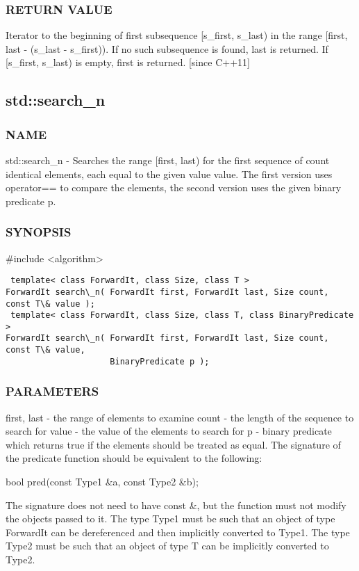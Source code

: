 \subsubsection{RETURN VALUE}
Iterator to the beginning of first subsequence [s\_first, s\_last) in the range [first, last - (s\_last - s\_first)). If no such subsequence is found, last is returned.
If [s\_first, s\_last) is empty, first is returned.  [since C++11]



\subsection{std::search\_n}

\subsubsection{NAME}
std::search\_n - Searches the range [first, last) for the first sequence of count identical elements, each equal to the given value value. The first version uses operator== to compare the elements, the second version uses the given binary predicate p.

\subsubsection{SYNOPSIS}
\#include <algorithm>

\begin{lstlisting}
 template< class ForwardIt, class Size, class T >
ForwardIt search\_n( ForwardIt first, ForwardIt last, Size count, const T\& value );
 template< class ForwardIt, class Size, class T, class BinaryPredicate >
ForwardIt search\_n( ForwardIt first, ForwardIt last, Size count, const T\& value,
                     BinaryPredicate p );
\end{lstlisting}

\subsubsection{PARAMETERS}
first, last - the range of elements to examine
count - the length of the sequence to search for
value - the value of the elements to search for
p - binary predicate which returns true  if the elements should be treated as equal.
The signature of the predicate function should be equivalent to the following:

 bool pred(const Type1 \&a, const Type2 \&b);

The signature does not need to have const \&, but the function must not modify the objects passed to it.
The type Type1 must be such that an object of type ForwardIt can be dereferenced and then implicitly converted to Type1. The type Type2 must be such that an object of type T can be implicitly converted to Type2.


